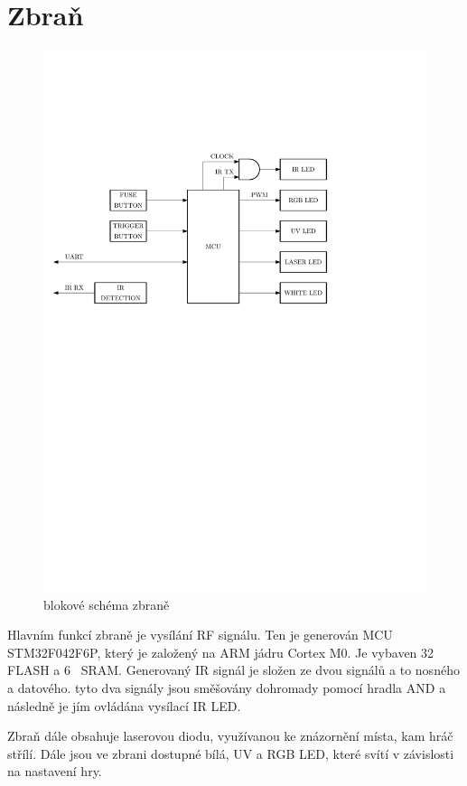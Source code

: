 \section{Zbraň}
\begin{figure}[H]
    \begin{center}
        \includegraphics[width=\textwidth]{img/gun}
    \end{center}
    \caption{blokové schéma zbraně}
\end{figure}
Hlavním funkcí zbraně je vysílání RF signálu. Ten je generován MCU STM32F042F6P, který je založený na ARM jádru Cortex M0. Je vybaven 32~ FLASH a 6~ SRAM. Generovaný IR signál je složen ze dvou signálů a to nosného a datového. tyto dva signály jsou směšovány dohromady pomocí hradla AND a následně je jím ovládána vysílací IR LED.

Zbraň dále obsahuje laserovou diodu, využívanou ke znázornění místa, kam hráč střílí. Dále jsou ve zbrani dostupné bílá, UV a RGB LED, které svítí v závislosti na nastavení hry.

